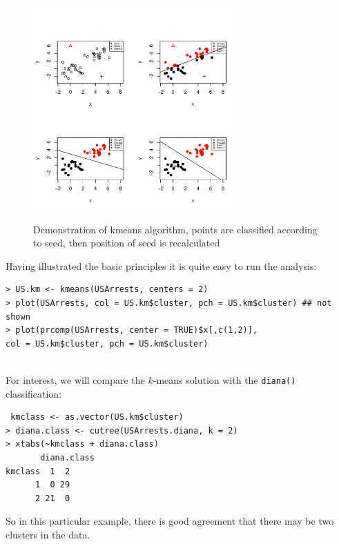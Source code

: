 \begin{figure}
\begin{center}
\includegraphics[width = 0.7\textwidth]{images/kmeansdemo}
\label{kmeansdemo}
\caption{Demonstration of kmeans algorithm, points are classified according to seed, then position of seed is recalculated}
\end{center}
\end{figure}

Having illustrated the basic principles it is quite easy to run the analysis:

\singlespacing
\begin{verbatim}
> US.km <- kmeans(USArrests, centers = 2)
> plot(USArrests, col = US.km$cluster, pch = US.km$cluster) ## not shown
> plot(prcomp(USArrests, center = TRUE)$x[,c(1,2)], 
col = US.km$cluster, pch = US.km$cluster)
 
\end{verbatim}
\onehalfspacing
For interest, we will compare the $k$-means solution with the \verb+diana()+ classification: 

\singlespacing
\begin{verbatim}
 kmclass <- as.vector(US.km$cluster)
> diana.class <- cutree(USArrests.diana, k = 2)
> xtabs(~kmclass + diana.class)
       diana.class
kmclass  1  2
      1  0 29
      2 21  0
\end{verbatim}
\onehalfspacing

So in this particular example, there is good agreement that there may be two clusters in the data.

